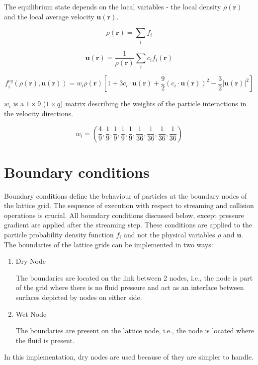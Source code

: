 \documentclass[a4paper,11pt]{report}
\begin{document}
The equilibrium state depends on the local variables - the local density $\rho(\mathbf{r})$ and the local average velocity $\mathbf{u}(\mathbf{r})$.

\begin{equation}
    \rho (\mathbf{r}) =  \sum_i f_i
\end{equation}

\begin{equation}
    \mathbf{u}(\mathbf{r}) = \frac1 {\rho (\mathbf{r})} \sum_i {c_i f_i\left(\mathbf{r}\right)}
\end{equation}

\begin{equation}
f^{eq}_i(\rho(\mathbf{r}),\mathbf{u}(\mathbf{r})) = w_i \rho(\mathbf{r})\left[1+3 c_i \cdot \mathbf{u}(\mathbf{r})+ \frac9 2 (c_i \cdot \mathbf{u}(\mathbf{r}))^2 - \frac3 2 |\mathbf{u}(\mathbf{r})|^2\right] 
\end{equation}

$w_i$ is a $1\times 9$ ($1\times q$) matrix describing the weights of the particle interactions in the velocity directions.

\begin{equation}
    w_i=(\frac4 9,\frac1 9,\frac1 9,\frac1 9,\frac1 9,\frac1 {36},\frac1 {36},\frac1 {36},\frac1 {36})
\end{equation}


\section{Boundary conditions}
\label{sec:boundary}
Boundary conditions define the behaviour of particles at the boundary nodes of the lattice grid. The sequence of execution with respect to streaming and collision operations is crucial. All boundary conditions discussed below, except pressure gradient are applied after the streaming step. These conditions are applied to the particle probability density function $f_i$ and not the physical variables $\rho$ and $\mathbf{u}$. \\

\noindent The boundaries of the lattice grids can be implemented in two ways: \cite{liu_zhou_2014}
    \begin{enumerate}
        \item Dry Node 
        
        The boundaries are located on the link between 2 nodes, i.e., the node is part of the grid where there is no fluid pressure and act as an interface between surfaces depicted by nodes on either side.

        \item Wet Node

        The boundaries are present on the lattice node, i.e., the node is located where the fluid is present.
    \end{enumerate}
\noindent In this implementation, dry nodes are used because of they are simpler to handle.
\end{document}
